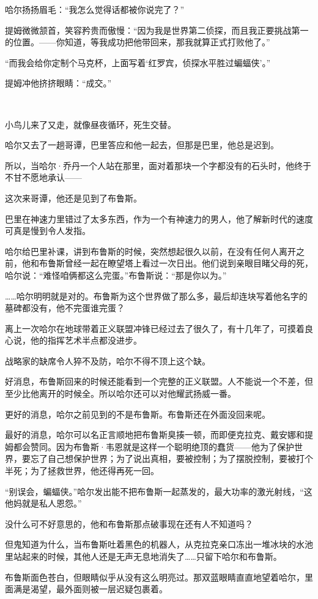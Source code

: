 \documentclass[../main]{subfiles}
\begin{document}
哈尔扬扬眉毛：“我怎么觉得话都被你说完了？”

提姆微微颔首，笑容矜贵而傲慢：“因为我是世界第二侦探，而且我正要挑战第一的位置。——你知道，等我成功把他带回来，那我就算正式打败他了。”

“而我会给你定制个马克杯，上面写着‘红罗宾，侦探水平胜过蝙蝠侠’。”

提姆冲他挤挤眼睛：“成交。”

~\

小鸟儿来了又走，就像昼夜循环，死生交替。

哈尔又去了一趟哥谭，巴里答应和他一起去，但那是巴里，他总是迟到。

所以，当哈尔·乔丹一个人站在那里，面对着那块一个字都没有的石头时，他终于不甘不愿地承认——

这次来哥谭，他还是见到了布鲁斯。

巴里在神速力里错过了太多东西，作为一个有神速力的男人，他了解新时代的速度可真是慢到令人发指。

哈尔给巴里补课，讲到布鲁斯的时候，突然想起很久以前，在没有任何人离开之前，他和布鲁斯曾经一起在瞭望塔上看过一次日出。他们说到亲眼目睹父母的死，哈尔说：“难怪咱俩都这么完蛋。”布鲁斯说：“那是你以为。”

……哈尔明明就是对的。布鲁斯为这个世界做了那么多，最后却连块写着他名字的墓碑都没有，他不完蛋谁完蛋？

离上一次哈尔在地球带着正义联盟冲锋已经过去了很久了，有十几年了，可摸着良心说，他的指挥艺术半点都没进步。

战略家的缺席令人猝不及防，哈尔不得不顶上这个缺。

好消息，布鲁斯回来的时候还能看到一个完整的正义联盟。人不能说一个不差，但至少比他离开的时候全。所以哈尔还可以对他耀武扬威一番。

更好的消息，哈尔之前见到的不是布鲁斯。布鲁斯还在外面没回来呢。

最好的消息，哈尔可以名正言顺地把布鲁斯臭揍一顿，而即便克拉克、戴安娜和提姆都会赞同。因为布鲁斯·韦恩就是这样一个聪明绝顶的蠢货——他为了保护世界，要忘了自己想保护世界；为了说出真相，要被控制；为了摆脱控制，要被打个半死；为了拯救世界，他还得再死一回。

“别误会，蝙蝠侠。”哈尔发出能不把布鲁斯一起蒸发的，最大功率的激光射线，“这他妈就是私人恩怨。”

没什么可不好意思的，他和布鲁斯那点破事现在还有人不知道吗？

但鬼知道为什么，当布鲁斯吐着黑色的机器人，从克拉克亲口冻出一堆冰块的水池里站起来的时候，其他人还是无声无息地消失了……只留下哈尔和布鲁斯。

布鲁斯面色苍白，但眼睛似乎从没有这么明亮过。那双蓝眼睛直直地望着哈尔，里面满是渴望，最外面则被一层迟疑包裹着。
\end{document}
